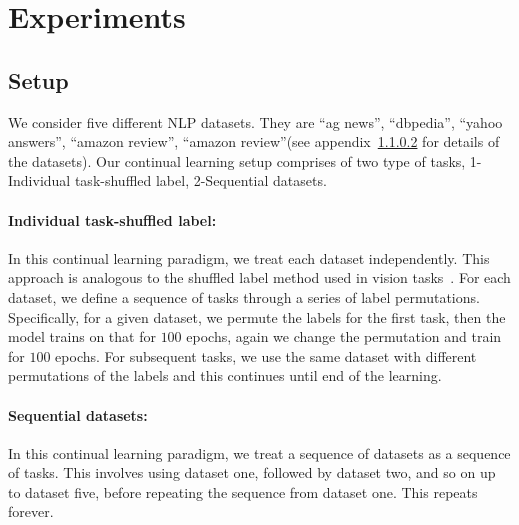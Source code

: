 \section{Experiments}

\subsection{Setup}

We consider five different NLP datasets. They are ``ag news'', ``dbpedia'', ``yahoo answers'', ``amazon review'', ``amazon review''(see appendix~\ref{} for details of the datasets).  Our continual learning setup comprises of two type of tasks, 1-Individual task-shuffled label, 2-Sequential datasets.

\paragraph{Individual task-shuffled label:}
In this continual learning paradigm, we treat each dataset independently. This approach
is analogous to the shuffled label method used in vision tasks~\cite{}. For each
dataset, we define a sequence of tasks through a series of label permutations.
Specifically, for a given dataset, we permute the labels for the first task, then the
model trains on that for $100$ epochs, again we change the permutation and train for
$100$ epochs. For subsequent tasks, we use the same dataset with different permutations
of the labels and this continues until end of the learning.


\paragraph{Sequential datasets:}
In this continual learning paradigm, we treat a sequence of datasets as a sequence of tasks. This involves using dataset one, followed by dataset two, and so on up to dataset five, before repeating the sequence from dataset one. This repeats forever.

